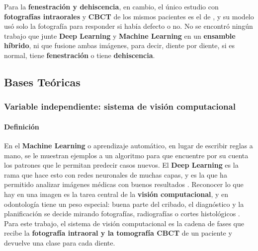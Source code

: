 \documentclass[12pt,a4paper]{article}
\newcommand{\prob}[1]{\textcolor{problema}{\textbf{#1}}}
\newcommand{\sol}[1]{\textcolor{solucion}{\textbf{#1}}}
\newcommand{\dat}[1]{\textcolor{dataset}{\textbf{#1}}}
\newcommand{\prob}[1]{#1}
\newcommand{\sol}[1]{#1}
\newcommand{\dat}[1]{#1}
\begin{document}
Para la \prob{fenestración y dehiscencia}, en cambio, el único estudio
con \dat{fotografías intraorales} y \dat{CBCT} de los mismos pacientes es
el de \textcite{liu2025fdtooth}, y su modelo usó solo la fotografía para
responder si había defecto o no. No se encontró ningún trabajo que junte
\sol{Deep Learning} y \sol{Machine Learning} en un \sol{ensamble
híbrido}, ni que fusione ambas imágenes, para decir, diente por diente,
si es normal, tiene \prob{fenestración} o tiene \prob{dehiscencia}.

\subsection{Bases Teóricas}
\subsubsection{Variable independiente: sistema de visión computacional}

\paragraph{Definición}
En el \sol{Machine Learning} o aprendizaje automático, en lugar de
escribir reglas a mano, se le muestran ejemplos a un algoritmo para que
encuentre por su cuenta los patrones que le permitan predecir casos
nuevos. El \sol{Deep Learning} es la rama que hace esto con redes
neuronales de muchas capas, y es la que ha permitido analizar imágenes
médicas con buenos resultados \parencite{yuan2026integrating}. Reconocer
lo que hay en una imagen es la tarea central de la \sol{visión
computacional}, y en odontología tiene un peso especial: buena parte del
cribado, el diagnóstico y la planificación se decide mirando fotografías,
radiografías o cortes histológicos \parencite{yuan2026integrating}. Para
este trabajo, el sistema de visión computacional es la cadena de fases
que recibe la \dat{fotografía intraoral y la tomografía CBCT} de un
paciente y devuelve una clase para cada diente.
\end{document}
